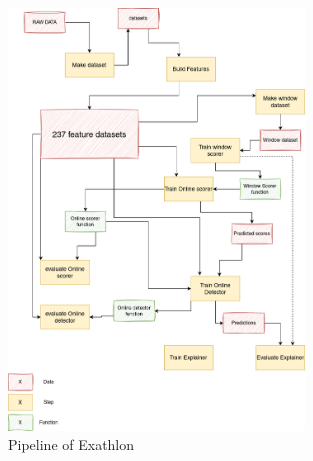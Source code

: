 \documentclass[oneside, a4paper, onecolumn, 11pt]{article}
\begin{document}
\begin{figure}[h]
    \centering
    \includegraphics[width=0.7\textwidth]{images/pipeline.drawio.png} %
    \caption{Pipeline of Exathlon}
    \label{fig:pipeline}
\end{figure}
\end{document}
